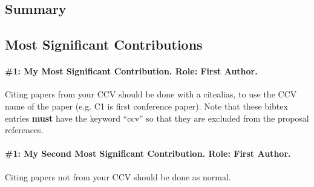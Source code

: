 \documentclass[main.tex]{subfiles}
\begin{document}
\subsection{Summary}

\subsection{Most Significant Contributions}
\paragraph{\#1:  My Most Significant Contribution. Role: First Author.}
Citing papers from your CCV should be done with a citealias, to use the CCV name of the paper (e.g. C1 is first conference paper). Note that these bibtex entries \textbf{must} have the keyword ``ccv'' so that they are excluded from the proposal references.


\paragraph{\#1: \citep{me2016notinccv} My Second Most Significant Contribution. Role: First Author.}
Citing papers not from your CCV should be done as normal.
\end{document}
